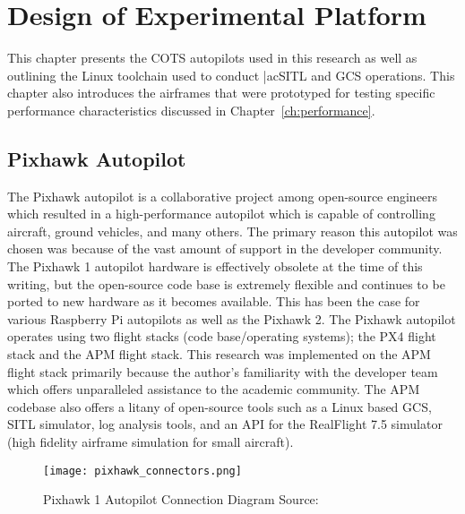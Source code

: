 \chapter{Design of Experimental Platform}\label{ch:platform}

This chapter presents the \ac{COTS} autopilots used in this research as well as outlining the Linux toolchain used to conduct |ac{SITL} and \ac{GCS} operations.  This chapter also introduces the airframes that were prototyped for testing specific performance characteristics discussed in Chapter~\ref{ch:performance}.

\section{Pixhawk Autopilot}
The Pixhawk autopilot is a collaborative project among open-source engineers which resulted in a high-performance autopilot which is capable of controlling aircraft, ground vehicles, and many others.  The primary reason this autopilot was chosen was because of the vast amount of support in the developer community.  The Pixhawk 1 autopilot hardware is effectively obsolete at the time of this writing, but the open-source code base is extremely flexible and continues to be ported to new hardware as it becomes available.  This has been the case for various Raspberry Pi autopilots as well as the Pixhawk 2.  The Pixhawk autopilot operates using two flight stacks (code base/operating systems); the PX4 flight stack and the \ac{APM} flight stack.  This research was implemented on the \ac{APM} flight stack primarily because the author's familiarity with the developer team which offers unparalleled assistance to the academic community.  The \ac{APM} codebase also offers a litany of open-source tools such as a Linux based \ac{GCS}, \ac{SITL} simulator, log analysis tools, and an \ac{API} for the RealFlight 7.5 simulator (high fidelity airframe simulation for small aircraft).

\begin{figure}[h!]
 \centering
  \texttt{[image: pixhawk\_connectors.png]}
  \caption{Pixhawk 1 Autopilot Connection Diagram Source:\cite{apm_org}}
  \label{fig:pixhawk_autopilot}
\end{figure}

